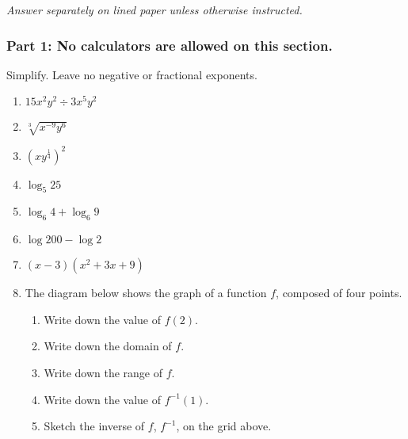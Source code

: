 \documentclass[12pt, twoside]{article}
\begin{document}
\textit{Answer separately on lined paper unless otherwise instructed.}
\subsubsection*{Part 1: No calculators are allowed on this section.}

Simplify. Leave no negative or fractional exponents.

\begin{enumerate}

\item $15x^{2}y^2 \div 3x^5 y^{2}$
\item $\sqrt[3]{x^{-9} y^{6}}$
\item $\displaystyle \left( x y^{\frac{1}{4}}\right)^2$
\item $\log_5 25$
\item $\log_6 4 + \log_6 9$
\item $\log 200 - \log 2$
\item $(x-3)(x^2+3x+9)$

\item The diagram below shows the graph of a function $f$, composed of four points.
  \begin{center}
  \end{center}

\begin{enumerate}
    \item Write down the value of $f(2)$.
    \item Write down the domain of $f$.
    \item Write down the range of $f$.
    \item Write down the value of $f^{-1}(1)$.
    \item Sketch the inverse of $f$, $f^{-1}$, on the grid above.
\end{enumerate}


\end{enumerate}
\end{document}
